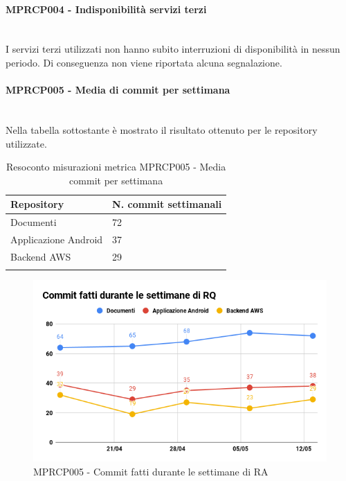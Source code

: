 \paragraph{MPRCP004 - Indisponibilità servizi terzi}\mbox{}\\[0.4cm]
I servizi terzi utilizzati non hanno subito interruzioni di disponibilità in nessun periodo. Di conseguenza non viene riportata alcuna segnalazione.
\paragraph{MPRCP005 - Media di commit per settimana}\mbox{}\\[0.4cm]
Nella tabella sottostante è mostrato il risultato ottenuto per le repository utilizzate.
\begin{center}
	\centering
	\renewcommand{\arraystretch}{1.5}
	\begin{longtable}{  p{5cm}  p{5cm} }
		\rowcolor{tableHeadYellow}
		\textbf{Repository}   & \textbf{N. commit settimanali} \\ 
		\endhead
		Documenti    			   & 72 \\
		Applicazione Android  & 37 \\
		Backend AWS    & 29          \\
		\rowcolor{white}
		\caption{Resoconto misurazioni metrica MPRCP005 - Media commit per settimana}
	\end{longtable}
\end{center}
\begin{figure}[H]
	\centering
	\includegraphics[width=13cm,keepaspectratio]{../includes/pics/Commit_RA.png}
	\caption{\label{fig:mission}MPRCP005 - Commit fatti durante le settimane di RA}
\end{figure}
